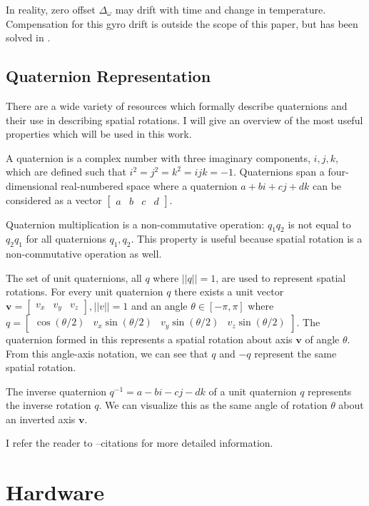 \documentclass[12pt]{report}
\begin{document}
In reality, zero offset $\Delta_\omega$ may drift with time and change in temperature. Compensation for this gyro drift is outside the scope of this paper, but has been solved in \cite{choukroun04}.

\subsection{Quaternion Representation}

There are a wide variety of resources which formally describe quaternions and their use in describing spatial rotations. I will give an overview of the most useful properties which will be used in this work.

A quaternion is a complex number with three imaginary components, $i,j,k$, which are defined such that $i^2 = j^2 = k^2 = ijk = -1$. Quaternions span a four-dimensional real-numbered space where a quaternion $a + b i + c j + d k$ can be considered as a vector $\begin{bmatrix}a & b & c & d \end{bmatrix}$. 

Quaternion multiplication is a non-commutative operation: $q_1 q_2$ is not equal to $q_2 q_1$ for all quaternions $q_1, q_2$. This property is useful because spatial rotation is a non-commutative operation as well.

The set of unit quaternions, all $q$ where $ ||q|| = 1$, are used to represent spatial rotations. For every unit quaternion $q$ 
there exists a unit vector $\mathbf{v} = \begin{bmatrix} v_x & v_y & v_z \end{bmatrix}, ||v|| = 1$ 
and an angle $\theta \in [-\pi, \pi]$ where 
$q = \begin{bmatrix} \cos (\theta/2) & v_x \sin (\theta/2) & v_y \sin (\theta/2) & v_z \sin (\theta/2)\end{bmatrix}$. The quaternion formed in this represents a spatial rotation about axis $\mathbf{v}$ of angle $\theta$. 
From this angle-axis notation, we can see that $q$ and $-q$ represent the same spatial rotation. 

The inverse quaternion $q^{-1} = a - bi - cj - dk$ of a unit quaternion $q$ represents the inverse rotation $q$. We can visualize this as the same angle of rotation $\theta$ about an inverted axis $\mathbf{v}$.

I refer the reader to --citations for more detailed information.

\section{Hardware}
\end{document}
